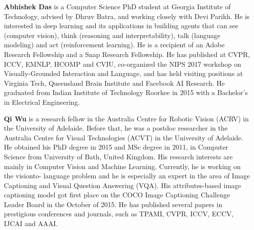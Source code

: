 {\bfseries Abhishek Das} is a Computer Science PhD student
at Georgia Institute of Technology, advised
by Dhruv Batra, and working closely with Devi
Parikh. He is interested in deep learning and its
applications in building agents that can see (computer
vision), think (reasoning and interpretability),
talk (language modeling) and act (reinforcement
learning). He is a recipient of an Adobe Research
Fellowship and a Snap Research Fellowship.
He has published at CVPR, ICCV, EMNLP,
HCOMP and CVIU, co-organized the NIPS 2017
workshop on Visually-Grounded Interaction and
Language, and has held visiting positions at Virginia
Tech, Queensland Brain Institute and Facebook
AI Research. He graduated from Indian
Institute of Technology Roorkee in 2015 with a
Bachelor’s in Electrical Engineering.

{\bfseries Qi Wu} is a research fellow in the Australia
Centre for Robotic Vision (ACRV) in the University
of Adelaide. Before that, he was a postdoc
researcher in the Australia Centre for Visual Technologies
(ACVT) in the University of Adelaide.
He obtained his PhD degree in 2015 and MSc degree
in 2011, in Computer Science from University
of Bath, United Kingdom. His research interests
are mainly in Computer Vision and Machine
Learning. Currently, he is working on the visionto-
language problem and he is especially an expert
in the area of Image Captioning and Visual Question
Answering (VQA). His attributes-based image
captioning model got first place on the COCO
Image Captioning Challenge Leader Board in the
October of 2015. He has published several papers
in prestigious conferences and journals, such as
TPAMI, CVPR, ICCV, ECCV, IJCAI and AAAI.


